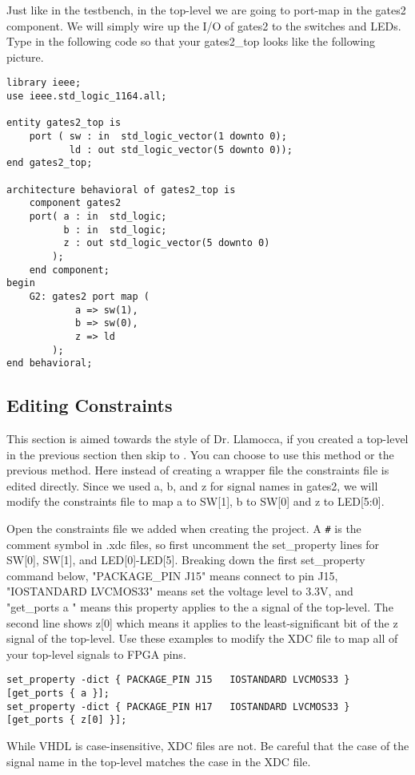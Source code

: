 Just like in the testbench, in the top-level we are going to port-map in the gates2 component.
We will simply wire up the I/O of gates2 to the switches and LEDs.
Type in the following code so that your gates2\_top looks like the following picture.

\begin{center}
\begin{minipage}{\textwidth}
\begin{verbatim}
library ieee;
use ieee.std_logic_1164.all;

entity gates2_top is
    port ( sw : in  std_logic_vector(1 downto 0);
           ld : out std_logic_vector(5 downto 0));
end gates2_top;

architecture behavioral of gates2_top is
    component gates2
    port( a : in  std_logic;
          b : in  std_logic;
          z : out std_logic_vector(5 downto 0)
        );
    end component;
begin
    G2: gates2 port map (
            a => sw(1),
            b => sw(0),
            z => ld
        );
end behavioral;
\end{verbatim}
\end{minipage}
\end{center}

\subsection{Editing Constraints}
\label{sec:constraints}
This section is aimed towards the style of Dr. Llamocca, if you created a top-level in the
previous section then skip to .
You can choose to use this method or the previous  method.
Here instead of creating a wrapper file the constraints file is edited directly.
Since we used a, b, and z for signal names in gates2, we will modify the constraints file to
map a to SW[1], b to SW[0] and z to LED[5:0].

Open the constraints file we added when creating the project.
A \verb|#| is the comment symbol in .xdc files, so first uncomment the set\_property lines
for SW[0], SW[1], and LED[0]-LED[5].
Breaking down the first set\_property command below, "PACKAGE\_PIN J15" means connect to pin
J15, "IOSTANDARD LVCMOS33" means set the voltage level to 3.3V, and "get\_ports { a }" means
this property applies to the a signal of the top-level.
The second line shows z[0] which means it applies to the least-significant bit of the z signal of
the top-level.
Use these examples to modify the XDC file to map all of your top-level signals to FPGA pins.

\begin{verbatim}
set_property -dict { PACKAGE_PIN J15   IOSTANDARD LVCMOS33 } [get_ports { a }];
set_property -dict { PACKAGE_PIN H17   IOSTANDARD LVCMOS33 } [get_ports { z[0] }];
\end{verbatim}

\begin{mdframed}[style=note]
    While VHDL is case-insensitive, XDC files are not.
    Be careful that the case of the signal name in the top-level matches the case in the XDC file.
\end{mdframed}
